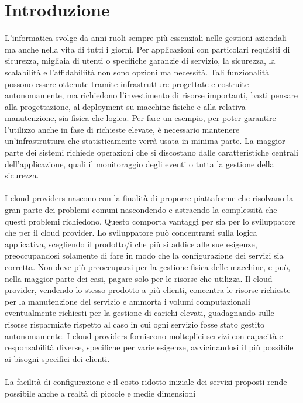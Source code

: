 \section*{Introduzione}

L'informatica svolge da anni ruoli sempre più essenziali nelle gestioni aziendali ma anche nella vita di tutti i giorni. 
Per applicazioni con particolari requisiti di sicurezza, migliaia di utenti o specifiche garanzie di servizio, la sicurezza, 
la scalabilità e l'affidabiliità non sono opzioni ma necessità. 
Tali funzionalità possono essere ottenute tramite infrastrutture progettate e costruite autonomamente, 
ma richiedono l'investimento di risorse importanti, basti pensare alla progettazione, al deployment su macchine fisiche e alla relativa manutenzione, sia fisica che logica.
Per fare un esempio, per poter garantire l'utilizzo anche in fase di richieste elevate, è necessario mantenere un'infrastruttura che statisticamente verrà usata in minima parte.
La maggior parte dei sistemi richiede operazioni che si discostano dalle caratteristiche centrali dell'applicazione, 
quali il monitoraggio degli eventi o tutta la gestione della sicurezza.\\
\\
I cloud providers nascono con la finalità di proporre piattaforme che risolvano la gran parte dei problemi comuni 
nascondendo e astraendo la complessità che questi problemi richiedono.
Questo comporta vantaggi per sia per lo sviluppatore che per il cloud provider. 
Lo sviluppatore può concentrarsi sulla logica applicativa, scegliendo il prodotto/i che più si addice alle sue esigenze, 
preoccupandosi solamente di fare in modo che la configurazione dei servizi sia corretta. 
Non deve più preoccuparsi per la gestione fisica delle macchine, e può, nella maggior parte dei casi, pagare solo per le risorse che utilizza.
Il cloud provider, vendendo lo stesso prodotto a più clienti, concentra le risorse richieste per la manutenzione del servizio
e ammorta i volumi computazionali eventualmente richiesti per la gestione di carichi elevati, 
guadagnando sulle risorse risparmiate rispetto al caso in cui ogni servizio fosse stato gestito autonomamente.
I cloud providers forniscono molteplici servizi con capacità e responsabilità diverse, specifiche per varie esigenze, 
avvicinandosi il più possibile ai bisogni specifici dei clienti.\\
\\
La facilità di configurazione e il costo ridotto iniziale dei servizi proposti rende possibile anche a realtà di piccole e medie dimensioni 
